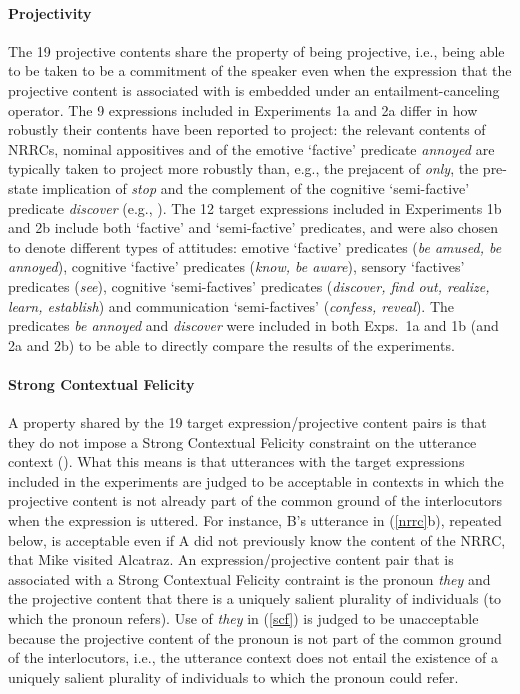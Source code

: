 \documentclass[11pt,fleqn]{article}
\newcommand{\6}{\mbox{$[\hspace*{-.6mm}[$}}
\newcommand{\9}{\mbox{$]\hspace*{-.6mm}]$}}
\begin{document}
\paragraph{Projectivity} The 19 projective contents share the property of being projective, i.e., being able to be taken to be a commitment of the speaker even when the expression that the projective content is associated with is embedded under an entailment-canceling operator. The 9 expressions included in Experiments 1a and 2a differ in how robustly their contents have been reported to project: 
the relevant contents of NRRCs, nominal appositives and of the emotive `factive' predicate {\em annoyed} are typically taken to project more robustly than, e.g., the prejacent of {\em only}, the pre-state implication of {\em stop} and the complement of the cognitive `semi-factive' predicate {\em discover} (e.g., \citealt{karttunen71b,simons01,potts05,abusch10,beaver-belly}). The 12 target expressions included in Experiments 1b and 2b include both `factive' and `semi-factive' predicates, and were also chosen to denote different types of attitudes: emotive `factive' predicates ({\em be amused, be annoyed}), cognitive `factive' predicates ({\em know, be aware}), sensory `factives' predicates ({\em see}), cognitive `semi-factives' predicates ({\em discover, find out, realize, learn, establish}) and communication `semi-factives' ({\em confess, reveal}). The predicates {\em be annoyed} and {\em discover} were included in both Exps.~1a and 1b (and 2a and 2b) to be able to directly compare the results of the experiments.

\paragraph{Strong Contextual Felicity} A property shared by the 19 target expression/projective content pairs is that they do not impose a Strong Contextual Felicity constraint on the utterance context (\citealt{brst-lang11}). What this means is that utterances with the target expressions included in the experiments are judged to be acceptable in contexts in which the projective content is not already part of the common ground of the interlocutors when the expression is uttered. For instance, B's utterance in (\ref{nrrc}b), repeated below, is acceptable even if A did not previously know the content of the NRRC, that Mike visited Alcatraz. An expression/projective content pair that is associated with a Strong Contextual Felicity contraint is the pronoun {\em they} and the projective content that there is a uniquely salient plurality of individuals (to which the pronoun refers). Use of {\em they} in (\ref{scf}) is judged to be unacceptable because the projective content of the pronoun is not part of the common ground of the interlocutors, i.e., the utterance context does not entail the existence of a uniquely salient plurality of individuals to which the pronoun could refer. 
\end{document}
